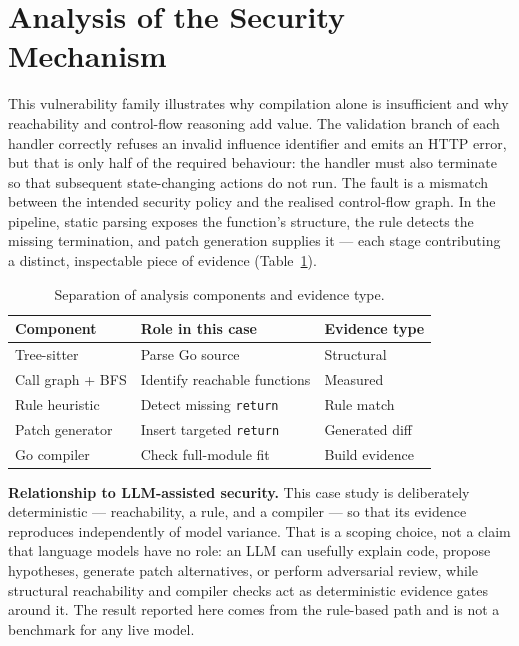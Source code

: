 \documentclass[sigconf]{acmart}
\begin{document}
\section{Analysis of the Security Mechanism}

This vulnerability family illustrates why compilation alone is insufficient and
why reachability and control-flow reasoning add value. The validation branch of
each handler correctly refuses an invalid influence identifier and emits an HTTP
error, but that is only half of the required behaviour: the handler must also
terminate so that subsequent state-changing actions do not run. The fault is a
mismatch between the intended security policy and the realised control-flow
graph. In the pipeline, static parsing exposes the function's structure, the
rule detects the missing termination, and patch generation supplies it ---
each stage contributing a distinct, inspectable piece of evidence
(Table~\ref{tab:components}).

\begin{table}[t]
\centering
\caption{Separation of analysis components and evidence type.}
\label{tab:components}
\small
\begin{tabular}{@{}lll@{}}
\toprule
Component & Role in this case & Evidence type \\
\midrule
Tree-sitter & Parse Go source & Structural \\
Call graph + BFS & Identify reachable functions & Measured \\
Rule heuristic & Detect missing \texttt{return} & Rule match \\
Patch generator & Insert targeted \texttt{return} & Generated diff \\
Go compiler & Check full-module fit & Build evidence \\
\bottomrule
\end{tabular}
\end{table}

\textbf{Relationship to LLM-assisted security.} This case study is deliberately
deterministic --- reachability, a rule, and a compiler --- so that its evidence
reproduces independently of model variance. That is a scoping choice, not a claim
that language models have no role: an LLM can usefully explain code, propose
hypotheses, generate patch alternatives, or perform adversarial review, while
structural reachability and compiler checks act as deterministic evidence gates
around it. The result reported here comes from the rule-based path and is not a
benchmark for any live model.
\end{document}
